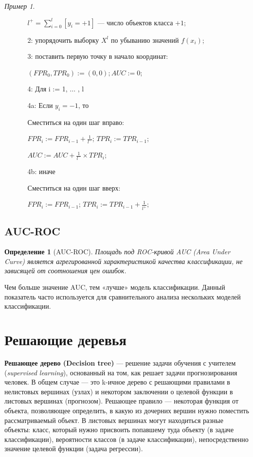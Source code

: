 \documentclass[a4paper, 12pt]{article}
\theoremstyle{plain} %
\newtheorem{definition}{Определение}
\theoremstyle{definition} %
\theoremstyle{remark} %
\newtheorem{example}{Пример}
\begin{document}
\begin{example}
\begin{enumerate}
\begin{enumerate}
			$l^{+} = \sum^{l}_{i=0}[y_{i}=+1]$ --- число объектов класса $+1$;
			\item[2:] упорядочить выборку $X^{l}$ по убыванию значений $f(x_{i})$;
			\item[3:] поставить первую точку в начало координат:

			$(FPR_{0}, TPR_{0}) := (0,0); AUC := 0$;
			\item[4:] Для i := 1, ... , l
			\item[4a:] Если $y_{i} = -1$, то

			Сместиться на один шаг вправо:

			$FPR_{i} := FPR_{i-1} + \frac{1}{l^{-}}$; $TPR_{i} := TPR_{i-1}$;

			$AUC := AUC + \frac{1}{l^{-}}\times TPR_{i}$;
			\item[4b:] иначе

			Сместиться на один шаг вверх:

			$FPR_{i} := FPR_{i-1}$; $TPR_{i} := TPR_{i-1} + \frac{1}{l^{+}}$;
		\end{enumerate}
	\end{enumerate}

\subsection{AUC-ROC}

\begin{definition}[AUC-ROC]
	Площадь под ROC-кривой AUC (Area Under Curve) является агрегированной характеристикой качества классификации, не зависящей от соотношения цен ошибок.
\end{definition}
Чем больше значение AUC, тем «лучше» модель классификации. Данный показатель часто используется для сравнительного анализа нескольких моделей классификации.

\section{Решающие деревья}

\textbf{Решающее дерево (Decision tree)} — решение задачи обучения с учителем (\emph{supervised learning}), основанный на том, как решает задачи прогнозирования человек. В общем случае — это k-ичное дерево с решающими правилами в нелистовых вершинах (узлах) и некотором заключении о целевой функции в листовых вершинах (прогнозом). Решающее правило — некоторая функция от объекта, позволяющее определить, в какую из дочерних вершин нужно поместить рассматриваемый объект. В листовых вершинах могут находиться разные объекты: класс, который нужно присвоить попавшему туда объекту (в задаче классификации), вероятности классов (в задаче классификации), непосредственно значение целевой функции (задача регрессии).


\end{example}
\end{document}
